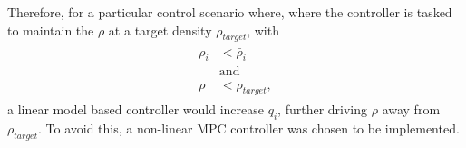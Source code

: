 \documentclass[preprint,authoryear,12pt]{elsarticle}
\begin{document}
Therefore, for a particular control scenario where, where the controller is tasked to maintain the $\rho$ at a target density $\rho_{target}$, with 
\begin{align}
	\begin{split}
	\rho_i &< \bar{\rho}_i \\
	&\text{and}\\
	\rho &< \rho_{target},
\end{split}
\label{eq:GainInversionScenario}
\end{align}
a linear model based controller would increase $q_i$, further driving $\rho$ away from $\rho_{target}$. To avoid this, a non-linear MPC controller was chosen to be implemented. 
\end{document}

